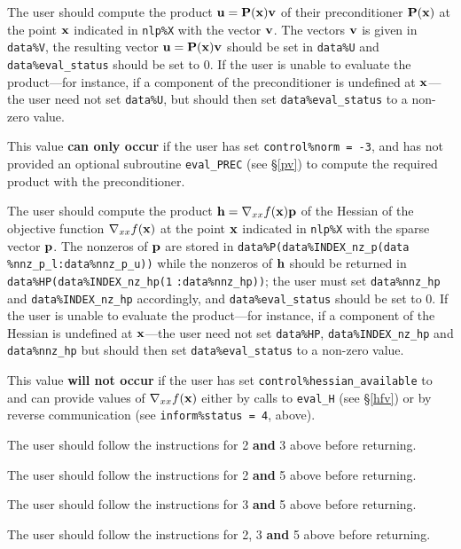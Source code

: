 \documentclass{galahad}
\begin{document}
\begin{description}
 The user should compute the product ${\mathbf{u}} = {\mathbf{P}}({\mathbf{x}}){\mathbf{v}}$
     of their preconditioner ${\mathbf{P}}({\mathbf{x}})$ at the point ${\mathbf{x}}$
     indicated in {\tt nlp\%X} with the vector ${\mathbf{v}}$.
     The vectors ${\mathbf{v}}$ is given in {\tt data\%V}, the
     resulting vector ${\mathbf{u}} = {\mathbf{P}}({\mathbf{x}}){\mathbf{v}}$ should be set in {\tt data\%U}
     and {\tt data\%eval\_status}
     should be set to 0. If the user is unable to evaluate the product---for
     instance, if a component of the preconditioner is undefined at
     ${\mathbf{x}}$---the user need not set {\tt data\%U}, but should then set
     {\tt data\%eval\_status} to a non-zero value.

     \noindent
     This value {\bf can only occur} if the user has set 
     {\tt control\%norm = -3}, and has not provided an optional
     subroutine {\tt eval\_PREC} (see \S\ref{pv}) to compute the required
     product with the preconditioner.

 The user should compute the product
     ${\mathbf{h}} = \nabla_{xx} f({\mathbf{x}}){\mathbf{p}}$ of the Hessian
     of the objective function $\nabla_{xx} f({\mathbf{x}})$ at the point ${\mathbf{x}}$
     indicated in {\tt nlp\%X} with the sparse vector ${\mathbf{p}}$.
     The nonzeros of ${\mathbf{p}}$ are stored in
     {\tt data\%P(data\%INDEX\_nz\_p(data}
     {\tt \%nnz\_p\_l:data\%nnz\_p\_u))}
     while the nonzeros of ${\mathbf{h}}$ should be returned in
     {\tt data\%HP(data\%INDEX\_nz\_hp(1}
     {\tt :data\%nnz\_hp))}; the user must set 
     {\tt data\%nnz\_hp} and {\tt data\%INDEX\_nz\_hp} accordingly,
     and  {\tt data\%eval\_status} should be set to 0. If the user is
     unable to evaluate the product---for instance, if a component of 
     the Hessian is undefined at ${\mathbf{x}}$---the user need not set 
     {\tt data\%HP}, {\tt data\%INDEX\_nz\_hp} and {\tt data\%nnz\_hp}
     but should then set {\tt data\%eval\_status} to a non-zero value.

     \noindent
     This value {\bf will not occur} if the user has set 
     {\tt control\%hessian\_available} to \true\, and can provide
     values of $\nabla_{xx} f({\mathbf{x}})$  either by calls to {\tt eval\_H} 
     (see \S\ref{hfv}) or by reverse communication (see 
     {\tt inform\%status = 4}, above).

 The user should follow the instructions for 2 {\bf and} 3 
     above before returning.

 The user should follow the instructions for 2 {\bf and} 5
     above before returning.

 The user should follow the instructions for 3 {\bf and} 5
     above before returning.

 The user should follow the instructions for 2, 3 {\bf and} 5 
     above before returning.

\end{description}
\end{document}
